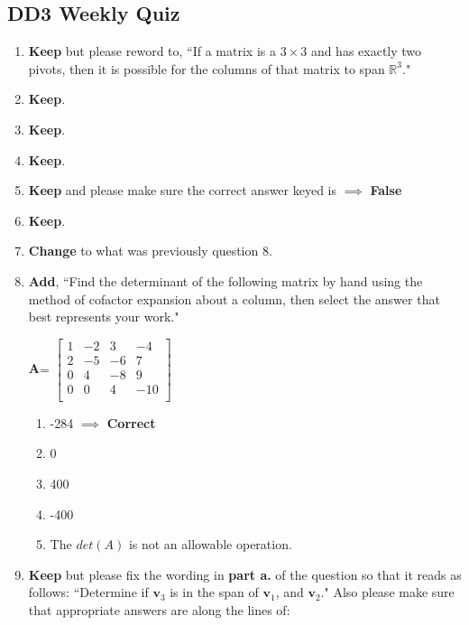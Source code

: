 \documentclass[fleqn]{article}[11pt]
\begin{document}
\subsection*{DD3 Weekly Quiz}

\begin{enumerate}
	\item \textbf{Keep} but please reword to, ``If a matrix is a $3\times3$ and has exactly two pivots, then it is possible for the columns of that matrix to span $\mathbb{R}^3$."
	
	\item \textbf{Keep}.
	
	\item \textbf{Keep}.
	
	\item \textbf{Keep}.
	
	\item \textbf{Keep} and please make sure the correct answer keyed is $\implies$ \textbf{False}
	
	\item \textbf{Keep}.
	
	\item \textbf{Change} to what was previously question 8.
	
	\item \textbf{Add}, ``Find the determinant of the following matrix by hand using the method of cofactor expansion about a column, then select the answer that best represents your work."
	
	$\mathbf{A}$=
	\(\begin{bmatrix}
		1 & -2 & 3 & -4 \\
		2 & -5 & -6 & 7 \\
		0 & 4 & -8 & 9 \\
		0 & 0 & 4 & -10 \\
	\end{bmatrix}\)
	\begin{enumerate}
		\item -284 $\implies$ \textbf{Correct}
		\item 0
		\item 400
		\item -400
		\item The $det(A)$ is not an allowable operation.
	\end{enumerate}

	\item \textbf{Keep} but please fix the wording in \textbf{part a.} of the question so that it reads as follows: ``Determine if $\mathbf{v}_3$ is in the span of $\mathbf{v}_1$, and $\mathbf{v}_2$." Also please make sure that appropriate answers are along the lines of: 
	

\end{enumerate}
\end{document}
